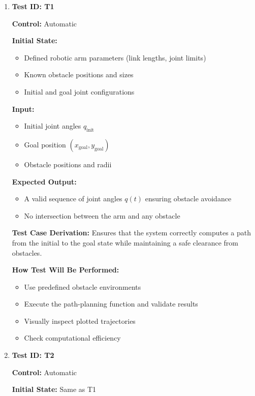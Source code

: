 \documentclass[12pt, titlepage]{article}
\begin{document}
\begin{enumerate}

\item \textbf{Test ID: T1}  

\textbf{Control:} Automatic  

\textbf{Initial State:}  
\begin{itemize}
    \item Defined robotic arm parameters (link lengths, joint limits)  
    \item Known obstacle positions and sizes  
    \item Initial and goal joint configurations  
\end{itemize}

\textbf{Input:}  
\begin{itemize}
    \item Initial joint angles \( q_{\text{init}} \)  
    \item Goal position \( (x_{\text{goal}}, y_{\text{goal}}) \)  
    \item Obstacle positions and radii  
\end{itemize}

\textbf{Expected Output:}  
\begin{itemize}
    \item A valid sequence of joint angles \( q(t) \) ensuring obstacle avoidance  
    \item No intersection between the arm and any obstacle  
\end{itemize}

\textbf{Test Case Derivation:} Ensures that the system correctly computes a path from the initial to the goal state while maintaining a safe clearance from obstacles.  

\textbf{How Test Will Be Performed:}  
\begin{itemize}
    \item Use predefined obstacle environments  
    \item Execute the path-planning function and validate results  
    \item Visually inspect plotted trajectories  
    \item Check computational efficiency  
\end{itemize}

\item \textbf{Test ID: T2}  

\textbf{Control:} Automatic  

\textbf{Initial State:} Same as T1  


\end{enumerate}
\end{document}
